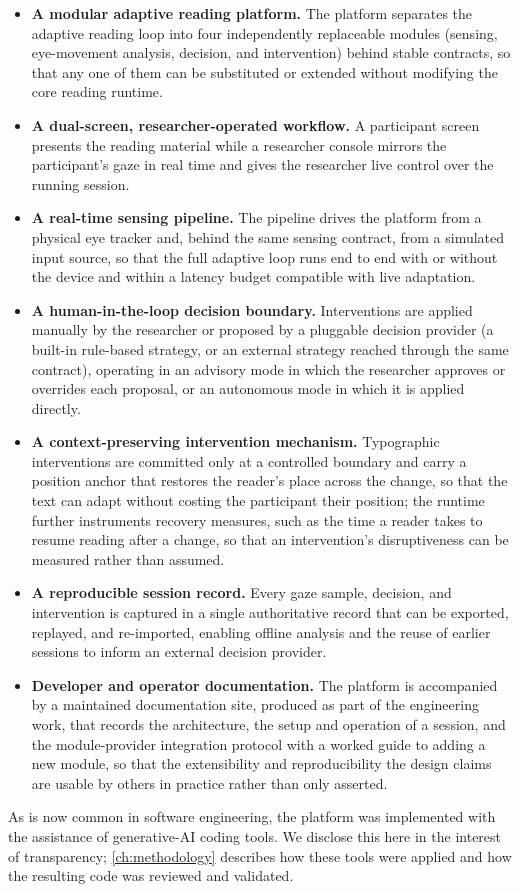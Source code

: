 \begin{itemize}

  \item \textbf{A modular adaptive reading platform.}
    The platform separates the adaptive reading loop into four independently replaceable modules (sensing, eye-movement analysis, decision, and intervention) behind stable contracts, so that any one of them can be substituted or extended without modifying the core reading runtime.

  \item \textbf{A dual-screen, researcher-operated workflow.}
    A participant screen presents the reading material while a researcher console mirrors the participant's gaze in real time and gives the researcher live control over the running session.

  \item \textbf{A real-time sensing pipeline.}
    The pipeline drives the platform from a physical eye tracker and, behind the same sensing contract, from a simulated input source, so that the full adaptive loop runs end to end with or without the device and within a latency budget compatible with live adaptation.

  \item \textbf{A human-in-the-loop decision boundary.}
    Interventions are applied manually by the researcher or proposed by a pluggable decision provider (a built-in rule-based strategy, or an external strategy reached through the same contract), operating in an advisory mode in which the researcher approves or overrides each proposal, or an autonomous mode in which it is applied directly.

  \item \textbf{A context-preserving intervention mechanism.}
    Typographic interventions are committed only at a controlled boundary and carry a position anchor that restores the reader's place across the change, so that the text can adapt without costing the participant their position; the runtime further instruments recovery measures, such as the time a reader takes to resume reading after a change, so that an intervention's disruptiveness can be measured rather than assumed.

  \item \textbf{A reproducible session record.}
    Every gaze sample, decision, and intervention is captured in a single authoritative record that can be exported, replayed, and re-imported, enabling offline analysis and the reuse of earlier sessions to inform an external decision provider.

  \item \textbf{Developer and operator documentation.}
    The platform is accompanied by a maintained documentation site, produced as part of the engineering work, that records the architecture, the setup and operation of a session, and the module-provider integration protocol with a worked guide to adding a new module, so that the extensibility and reproducibility the design claims are usable by others in practice rather than only asserted.

\end{itemize}

As is now common in software engineering, the platform was implemented with the assistance of generative-AI coding tools.
We disclose this here in the interest of transparency; \cref{ch:methodology} describes how these tools were applied and how the resulting code was reviewed and validated.
